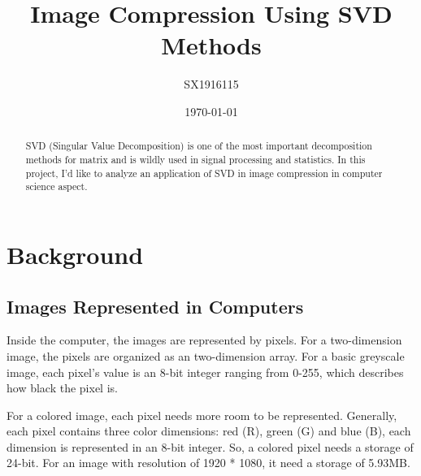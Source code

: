 \documentclass{article}
\begin{document}
    \title{Image Compression Using SVD Methods}
    \author{SX1916115}
    \date{\today}

    \maketitle

    \newpage

    \begin{abstract}
        SVD (Singular Value Decomposition)
        is one of the most important decomposition methods for matrix
        and is wildly used in signal processing and statistics.
        In this project, I’d like to analyze an application of
        SVD in image compression in computer science aspect.
    \end{abstract}

    \section{Background}

        \subsection{Images Represented in Computers}
            \par
            Inside the computer, the images are represented by pixels.
            For a two-dimension image,
            the pixels are organized as an two-dimension array.
            For a basic greyscale image,
            each pixel’s value is an 8-bit integer ranging from 0-255,
            which describes how black the pixel is.
            \par
            For a colored image, each pixel needs more room to be represented.
            Generally, each pixel contains three color dimensions: 
            red (R), green (G) and blue (B),
            each dimension is represented in an 8-bit integer. 
            So, a colored pixel needs a storage of 24-bit.
            For an image with resolution of 1920 * 1080,
            it need a storage of 5.93MB.
\end{document}
